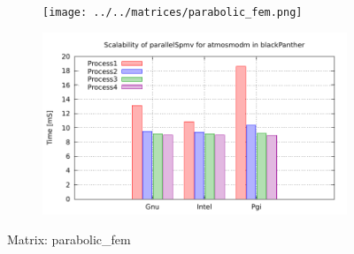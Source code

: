 \begin{figure} [ht!]
    \centering
    \captionsetup{justification=centering, singlelinecheck=false}
    \begin{subfigure}{.65\textwidth}
      \centering
      \hspace*{-3.5cm} 
      \texttt{[image: ../../matrices/parabolic\_fem.png]}
      \label{fig:parabolic_fem_matrix}
    \end{subfigure}%
    \begin{subfigure}{.65\textwidth}
      \centering
      \hspace*{-6.0cm} 
      \includegraphics[page=5, width=0.95\linewidth]{../plots/blackPanther.pdf}
      \label{fig:parabolic_fem_performance}
    \end{subfigure}
\caption{Matrix: parabolic\_fem}
\label{fig:parabolic_fem}
\end{figure}

